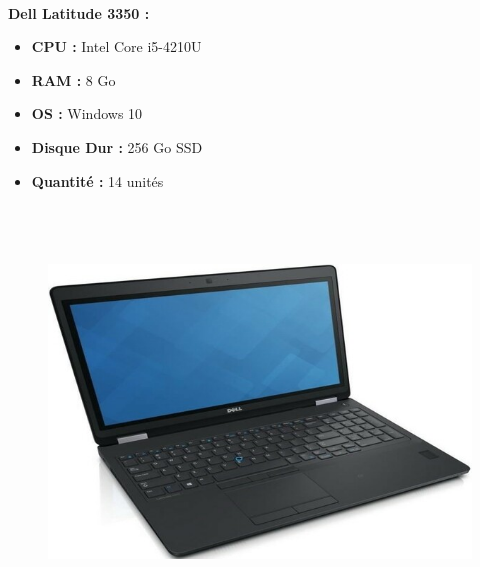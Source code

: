 \documentclass[11pt,a4paper,twoside]{article}
\begin{document}
\paragraph{}\textbf{Dell Latitude 3350 :} \\
\begin{itemize}
\item \textbf{CPU :} Intel Core i5-4210U
\item \textbf{RAM :} 8 Go
\item \textbf{OS :} Windows 10
\item \textbf{Disque Dur :} 256 Go SSD
\item \textbf{Quantité :} 14 unités
\\ \\ \\ \\
\end{itemize}
\begin{figure}
\includegraphics[scale=0.4]{Ressources/Materiel/LE5570.jpg}\vspace{-2cm}
\end{figure}
\end{document}
